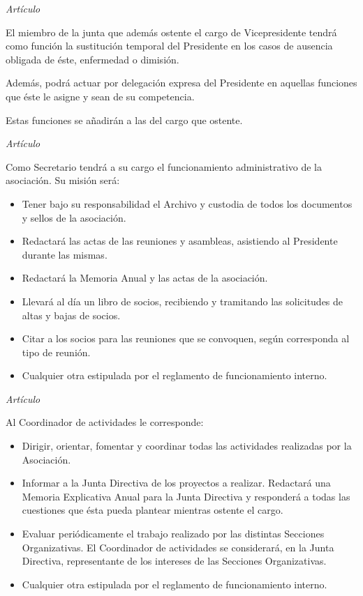 \documentclass[11pt,oneside,onecolumn,a4paper]{article} \usepackage[utf8]{inputenc} \usepackage[spanish]{babel} \usepackage{enumerate} \pagestyle{plain}
\newcounter{articulos} \setcounter{articulos}{1} \newcounter{capitulos} \setcounter{capitulos}{1} \newcounter{titulos} \setcounter{titulos}{1}
\newcommand{\articulo}{\medskip \noindent \emph{Artículo \arabic{articulos} } \smallskip \addtocounter{articulos}{1}} \newcommand{\titulo}[1]{\medskip \noindent \emph{Título \roman{titulos}:} #1 \addcontentsline{toc}{section}{Título \roman{titulos}: #1} \smallskip \addtocounter{titulos}{1}} \newcommand{\capitulo}[1]{\medskip \noindent \emph{Capítulo \roman{capitulos}:} #1 \addcontentsline{toc}{subsection}{Capítulo \roman{capitulos}: #1} \smallskip \addtocounter{capitulos}{1}}
\begin{document}
		\articulo

		El miembro de la junta que además ostente el cargo de Vicepresidente tendrá como función la sustitución temporal del Presidente en los casos de ausencia obligada de éste, enfermedad o dimisión.

		Además, podrá actuar por delegación expresa del Presidente en aquellas funciones que éste le asigne y sean de su competencia.

		Estas funciones se añadirán a las del cargo que ostente.

		\articulo

		Como Secretario tendrá a su cargo el funcionamiento administrativo de la asociación. Su misión será:

		\begin{itemize}

		  \item Tener bajo su responsabilidad el Archivo y custodia de todos los documentos y sellos de la asociación. \item Redactará las actas de las reuniones y asambleas, asistiendo al Presidente durante las mismas. \item Redactará la Memoria Anual y las actas de la asociación. \item Llevará al día un libro de socios, recibiendo y tramitando las solicitudes de altas y bajas de socios. \item Citar a los socios para las reuniones que se convoquen, según corresponda al tipo de reunión. \item Cualquier otra estipulada por el reglamento de funcionamiento interno.

		  \end{itemize}

		  \articulo

		  Al Coordinador de actividades le corresponde: \begin{itemize}

		    \item Dirigir, orientar, fomentar y coordinar todas las actividades realizadas por la Asociación. \item Informar a la Junta Directiva de los proyectos a realizar. Redactará una Memoria Explicativa Anual para la Junta Directiva y responderá a todas las cuestiones que ésta pueda plantear mientras ostente el cargo. \item Evaluar periódicamente el trabajo realizado por las distintas Secciones Organizativas. El Coordinador de actividades se considerará, en la Junta Directiva, representante de los intereses de las Secciones Organizativas. \item Cualquier otra estipulada por el reglamento de funcionamiento interno.

		    \end{itemize}
\end{document}
